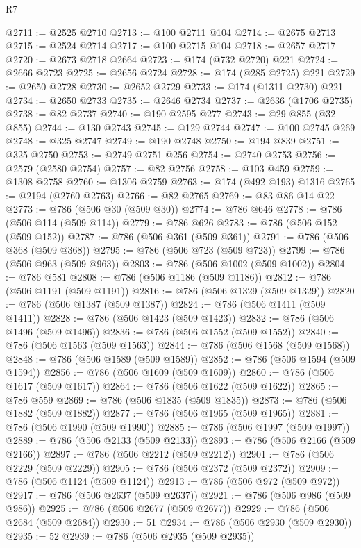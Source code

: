 \begin{lexlean}{R7}
\begin{coremodule}
@2711 := @2525 @2710
@2713 := @100 @2711 @104
@2714 := @2675 @2713
@2715 := @2524 @2714
@2717 := @100 @2715 @104
@2718 := @2657 @2717
@2720 := @2673 @2718 @2664
@2723 := @174 (@732 @2720) @221
@2724 := @2666 @2723
@2725 := @2656 @2724
@2728 := @174 (@285 @2725) @221
@2729 := @2650 @2728
@2730 := @2652 @2729
@2733 := @174 (@1311 @2730) @221
@2734 := @2650 @2733
@2735 := @2646 @2734
@2737 := @2636 (@1706 @2735)
@2738 := @82 @2737
@2740 := @190 @2595 @277
@2743 := @29 @855 (@32 @855)
@2744 := @130 @2743
@2745 := @129 @2744
@2747 := @100 @2745 @269
@2748 := @325 @2747
@2749 := @190 @2748
@2750 := @194 @839
@2751 := @325 @2750
@2753 := @2749 @2751 @256
@2754 := @2740 @2753
@2756 := @2579 (@2580 @2754)
@2757 := @82 @2756
@2758 := @103 @459
@2759 := @1308 @2758
@2760 := @1306 @2759
@2763 := @174 (@492 @193) @1316
@2765 := @2194 (@2760 @2763)
@2766 := @82 @2765
@2769 := @83 @86 @14 @22
@2773 := @786 (@506 @30 (@509 @30))
@2774 := @786 @646
@2778 := @786 (@506 @114 (@509 @114))
@2779 := @786 @626
@2783 := @786 (@506 @152 (@509 @152))
@2787 := @786 (@506 @361 (@509 @361))
@2791 := @786 (@506 @368 (@509 @368))
@2795 := @786 (@506 @723 (@509 @723))
@2799 := @786 (@506 @963 (@509 @963))
@2803 := @786 (@506 @1002 (@509 @1002))
@2804 := @786 @581
@2808 := @786 (@506 @1186 (@509 @1186))
@2812 := @786 (@506 @1191 (@509 @1191))
@2816 := @786 (@506 @1329 (@509 @1329))
@2820 := @786 (@506 @1387 (@509 @1387))
@2824 := @786 (@506 @1411 (@509 @1411))
@2828 := @786 (@506 @1423 (@509 @1423))
@2832 := @786 (@506 @1496 (@509 @1496))
@2836 := @786 (@506 @1552 (@509 @1552))
@2840 := @786 (@506 @1563 (@509 @1563))
@2844 := @786 (@506 @1568 (@509 @1568))
@2848 := @786 (@506 @1589 (@509 @1589))
@2852 := @786 (@506 @1594 (@509 @1594))
@2856 := @786 (@506 @1609 (@509 @1609))
@2860 := @786 (@506 @1617 (@509 @1617))
@2864 := @786 (@506 @1622 (@509 @1622))
@2865 := @786 @559
@2869 := @786 (@506 @1835 (@509 @1835))
@2873 := @786 (@506 @1882 (@509 @1882))
@2877 := @786 (@506 @1965 (@509 @1965))
@2881 := @786 (@506 @1990 (@509 @1990))
@2885 := @786 (@506 @1997 (@509 @1997))
@2889 := @786 (@506 @2133 (@509 @2133))
@2893 := @786 (@506 @2166 (@509 @2166))
@2897 := @786 (@506 @2212 (@509 @2212))
@2901 := @786 (@506 @2229 (@509 @2229))
@2905 := @786 (@506 @2372 (@509 @2372))
@2909 := @786 (@506 @1124 (@509 @1124))
@2913 := @786 (@506 @972 (@509 @972))
@2917 := @786 (@506 @2637 (@509 @2637))
@2921 := @786 (@506 @986 (@509 @986))
@2925 := @786 (@506 @2677 (@509 @2677))
@2929 := @786 (@506 @2684 (@509 @2684))
@2930 := 51
@2934 := @786 (@506 @2930 (@509 @2930))
@2935 := 52
@2939 := @786 (@506 @2935 (@509 @2935))

\end{coremodule}
\end{lexlean}

